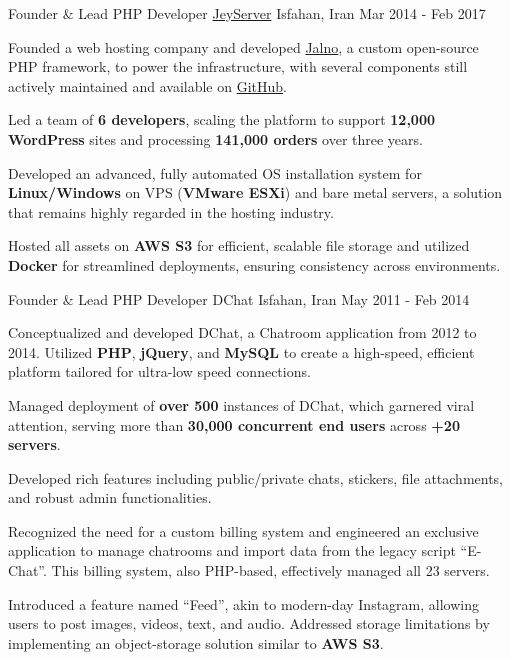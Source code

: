 \begin{cventries}
  \cventry
    {Founder \& Lead PHP Developer} %
    {\href{https://jeyserver.com}{JeyServer}} %
    {Isfahan, Iran} %
    {Mar 2014 - Feb 2017} %
    {
      \begin{cvitems}
        \item {Founded a web hosting company and developed \href{https://jalno.ir/en/}{Jalno}, a custom open-source PHP framework, to power the infrastructure, with several components still actively maintained and available on \href{https://github.com/jeyserver}{GitHub}.}
        \item {Led a team of \textbf{6 developers}, scaling the platform to support \textbf{12,000 WordPress} sites and processing \textbf{141,000 orders} over three years.}
        \item {Developed an advanced, fully automated OS installation system for \textbf{Linux/Windows} on VPS (\textbf{VMware ESXi}) and bare metal servers, a solution that remains highly regarded in the hosting industry.}
        \item {Hosted all assets on \textbf{AWS S3} for efficient, scalable file storage and utilized \textbf{Docker} for streamlined deployments, ensuring consistency across environments.}
      \end{cvitems}
    }
  
  \cventry
    {Founder \& Lead PHP Developer} %
    {DChat} %
    {Isfahan, Iran} %
    {May 2011 - Feb 2014} %
    {
      \begin{cvitems} %
        \item {Conceptualized and developed DChat, a Chatroom application from 2012 to 2014. Utilized \textbf{PHP}, \textbf{jQuery}, and \textbf{MySQL} to create a high-speed, efficient platform tailored for ultra-low speed connections.}
        \item {Managed deployment of \textbf{over 500} instances of DChat, which garnered viral attention, serving more than \textbf{30,000 concurrent end users} across \textbf{+20 servers}.}
        \item {Developed rich features including public/private chats, stickers, file attachments, and robust admin functionalities.}
        \item {Recognized the need for a custom billing system and engineered an exclusive application to manage chatrooms and import data from the legacy script “E-Chat”. This billing system, also PHP-based, effectively managed all 23 servers.}
        \item {Introduced a feature named “Feed”, akin to modern-day Instagram, allowing users to post images, videos, text, and audio. Addressed storage limitations by implementing an object-storage solution similar to \textbf{AWS S3}.}
      \end{cvitems}
    }

\end{cventries}
